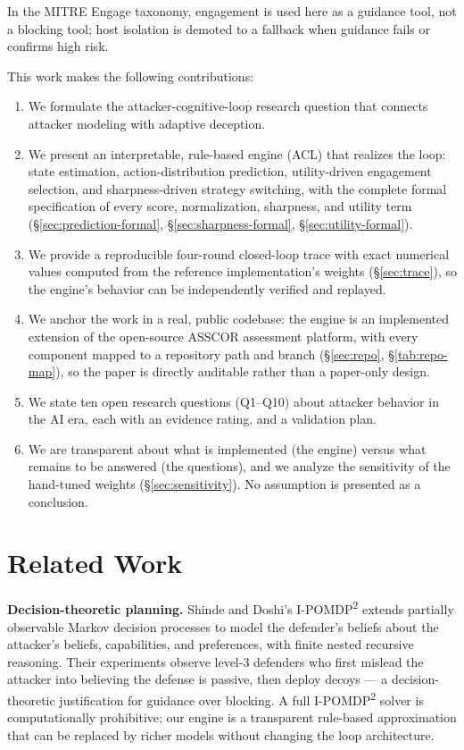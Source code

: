\documentclass[11pt]{article}
\begin{document}
In the MITRE Engage taxonomy, engagement is used here as a guidance tool,
not a blocking tool; host isolation is demoted to a fallback when guidance
fails or confirms high risk.

This work makes the following contributions:
\begin{enumerate}
\item We formulate the attacker-cognitive-loop research question that
      connects attacker modeling with adaptive deception.
\item We present an interpretable, rule-based engine (ACL) that realizes the
      loop: state estimation, action-distribution prediction, utility-driven
      engagement selection, and sharpness-driven strategy switching, with
      the complete formal specification of every score, normalization,
      sharpness, and utility term (\S\ref{sec:prediction-formal},
      \S\ref{sec:sharpness-formal}, \S\ref{sec:utility-formal}).
\item We provide a reproducible four-round closed-loop trace with exact
      numerical values computed from the reference implementation's weights
      (\S\ref{sec:trace}), so the engine's behavior can be independently
      verified and replayed.
\item We anchor the work in a real, public codebase: the engine is an
      implemented extension of the open-source ASSCOR assessment platform,
      with every component mapped to a repository path and branch
      (\S\ref{sec:repo}, \S\ref{tab:repo-map}), so the paper is directly
      auditable rather than a paper-only design.
\item We state ten open research questions (Q1--Q10) about attacker
      behavior in the AI era, each with an evidence rating, and a
      validation plan.
\item We are transparent about what is implemented (the engine) versus what
      remains to be answered (the questions), and we analyze the
      sensitivity of the hand-tuned weights (\S\ref{sec:sensitivity}). No
      assumption is presented as a conclusion.
\end{enumerate}

\section{Related Work}
\label{sec:related}

\textbf{Decision-theoretic planning.} Shinde and Doshi's
I-POMDP\textsuperscript{2} \cite{shinde-doshi} extends partially observable
Markov decision processes to model the defender's beliefs about the
attacker's beliefs, capabilities, and preferences, with finite nested
recursive reasoning. Their experiments observe level-3 defenders who first
mislead the attacker into believing the defense is passive, then deploy
decoys --- a decision-theoretic justification for guidance over blocking. A
full I-POMDP\textsuperscript{2} solver is computationally prohibitive; our
engine is a transparent rule-based approximation that can be replaced by
richer models without changing the loop architecture.
\end{document}
